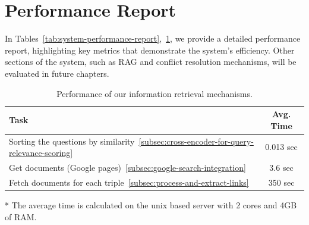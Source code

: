 \section{Performance Report}\label{sec:performance-report}
In Tables~\ref{tab:system-performance-report},~\ref{tab:system-performance-report-2}, we provide a detailed performance report, highlighting key metrics that demonstrate the system's efficiency.
Other sections of the system, such as RAG and conflict resolution mechanisms, will be evaluated in future chapters.
\begin{table}[ht!]
    \noindent
    \caption{Performance of our LLM-based tasks in production, generated by Openlit with Gemma2 model.}
    \label{tab:system-performance-report}
\end{table}
\begin{table}[ht!]
    \centering
    \caption{Performance of our information retrieval mechanisms.}
    \begin{threeparttable}
        \begin{tabular}{lc}
            \toprule
            \textbf{Task} & \textbf{Avg. Time}\tnote{*} \\
            \midrule
            Sorting the questions by similarity~\ref{subsec:cross-encoder-for-query-relevance-scoring} & 0.013 sec \\
            Get documents (Google pages)~\ref{subsec:google-search-integration} & 3.6 sec \\
            Fetch documents for each triple~\ref{subsec:process-and-extract-links} & 350 sec \\
            \bottomrule
        \end{tabular}
        \begin{tablenotes}
            \item[*] The average time is calculated on the unix based server with 2 cores and 4GB of RAM\@.
        \end{tablenotes}
    \end{threeparttable}
    \label{tab:system-performance-report-2}
\end{table}

